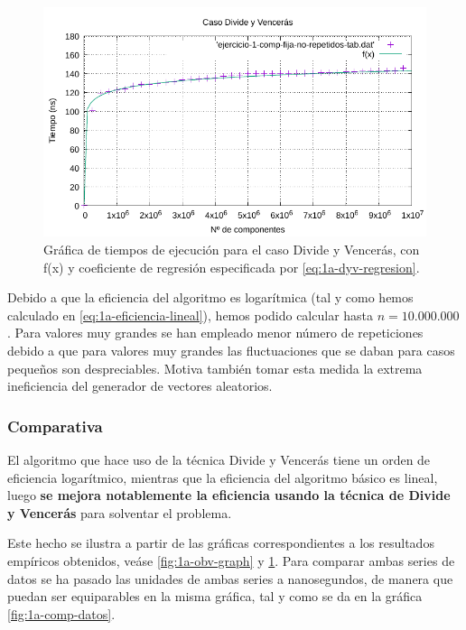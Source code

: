 \begin{figure}[h]
	\centering
	\includegraphics[scale=0.76]{img/e1a-dyv}
	\caption{Gráfica de tiempos de ejecución para el caso Divide y Vencerás, 
		con f(x) y coeficiente de regresión especificada por \ref{eq:1a-dyv-regresion}.}
	\label{fig:1a-dyv-graph}
\end{figure}

Debido a que la eficiencia del algoritmo es logarítmica (tal y como hemos calculado en \ref{eq:1a-eficiencia-lineal}),
hemos podido calcular hasta $n = 10.000.000$. Para valores muy grandes se han empleado menor número de repeticiones
debido a que para valores muy grandes las fluctuaciones que se daban para casos pequeños son despreciables. 
Motiva también tomar esta medida la extrema ineficiencia del generador de vectores aleatorios. 

\newpage

\subsubsection{Comparativa}

El algoritmo que hace uso de la técnica Divide y Vencerás tiene un orden de eficiencia logarítmico, mientras
que la eficiencia del algoritmo básico es lineal, luego \textbf{se mejora notablemente la eficiencia usando la técnica de 
Divide y Vencerás} para solventar el problema. 
   
Este hecho se ilustra a partir de las gráficas correspondientes a los resultados empíricos obtenidos, veáse 
\ref{fig:1a-obv-graph} y \ref{fig:1a-dyv-graph}. Para comparar ambas series de datos se ha pasado las unidades
de ambas series a nanosegundos, de manera que puedan ser equiparables en la misma gráfica, tal y como se da en 
la gráfica \ref{fig:1a-comp-datos}. 

